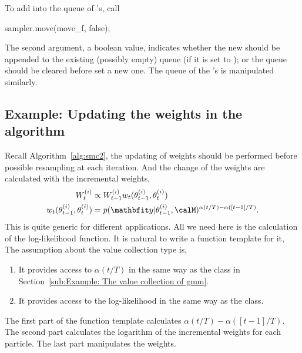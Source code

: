 To add  into the queue of 's, call
\begin{cppcode}
sampler.move(move_f, false);
\end{cppcode}
The second argument, a boolean value, indicates whether the new  should be appended to the existing (possibly empty) queue (if it is set to ); or the queue should be cleared before set a new one. The queue of the 's is manipulated similarly.

\subsection{Example: Updating the weights in the \smc[2] algorithm}
\label{sub:Example: Updating the weights in the SMC2 algorithm}

Recall Algorithm~\ref{alg:smc2}, the updating of weights should be performed before possible resampling at each iteration. And the change of the weights are calculated with the incremental weights,
\begin{align*}
  W_t^{(i)} &\propto W_{t-1}^{(i)} w_t(\theta_{t-1}^{(i)}, \theta_t^{(i)}) \\
  w_t(\theta_{t-1}^{(i)}, \theta_t^{(i)}) &=
  p(\data|\theta_{t-1}^{(i)},\calM)^{\alpha(t/T) - \alpha([t-1]/T)}.
\end{align*}
This is quite generic for different applications. All we need here is the calculation of the log-likelihood function. It is natural to write a function template for it,
The assumption about the value collection type  is,
\begin{enumerate}
  \item It provides access to $\alpha(t/T)$ in the same way as the  class in Section~\ref{sub:Example: The value collection of gmm}.
  \item It provides access to the log-likelihood in the same way as the  class.
\end{enumerate}
The first part of the function template  calculates $\alpha(t/T) - \alpha([t-1]/T)$. The second part calculates the logarithm of the incremental weights for each particle. The last part manipulates the weights.

